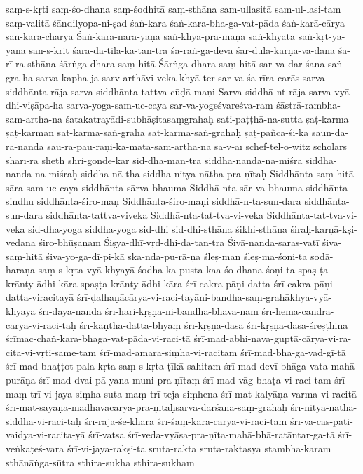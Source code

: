 {saṃ-s-kṛti 
saṃ-śo-dhana
saṃ-śodhitā
saṃ-sthāna
sam-ullasitā
sam-ul-lasi-tam
saṃ-valitā
śāndilyopa-ni-ṣad
śaṅ-kara
śaṅ-kara-bha-ga-vat-pāda
śaṅ-karā-cārya
san-kara-charya
Śaṅ-kara-nārā-yaṇa
saṅ-khyā-pra-māṇa
saṅ-khyāta
sāṅ-kṛt-yā-yana
san-s-krit
śāra-dā-tila-ka-tan-tra
śa-raṅ-ga-deva
śār-dūla-karṇā-va-dāna
śā-rī-ra-sthāna
śārṅga-dhara-saṃ-hitā
Śārṅga-dhara-saṃ-hitā
sar-va-dar-śana-saṅ-gra-ha
sarva-kapha-ja
sarv-arthāvi-veka-khyā-ter
sar-va-śa-rīra-carās
sarva-siddhānta-rāja
sarva-siddhānta-tattva-cūḍā-maṇi
Sarva-siddhā-nt-rāja
sarva-vyā-dhi-viṣāpa-ha
sarva-yoga-sam-uc-caya
sar-va-yogeśvareśva-ram
śāstrā-rambha-sam-artha-na
śatakatrayādi-subhāṣitasaṃgrahaḥ
sati-paṭṭhā-na-sutta
ṣaṭ-karma
ṣaṭ-karman
sat-karma-saṅ-graha
sat-karma-saṅ-grahaḥ
ṣaṭ-pañcā-śi-kā
saun-da-ra-nanda
sau-ra-pau-rāṇi-ka-mata-sam-artha-na
sa-v-āī
schef-tel-o-witz
scholars
sharī-ra
sheth
shri-gonde-kar
sid-dha-man-tra
siddha-nanda-na-miśra
siddha-nanda-na-miśraḥ
siddha-nā-tha
siddha-nitya-nātha-pra-ṇītaḥ
Siddhānta-saṃ-hitā-sāra-sam-uc-caya
siddhānta-sārva-bhauma
Siddhā-nta-sār-va-bhauma
siddhānta-sindhu
siddhānta-śiro-maṇ
Siddhānta-śiro-maṇi
siddhā-n-ta-sun-dara
siddhānta-sun-dara
siddhānta-tattva-viveka
Siddhā-nta-tat-tva-vi-veka
Siddhānta-tat-tva-vi-veka
sid-dha-yoga
siddha-yoga
sid-dhi
sid-dhi-sthāna
śikhi-sthāna
śiraḥ-karṇā-kṣi-vedana
śiro-bhūṣaṇam
Śiṣya-dhī-vṛd-dhi-da-tan-tra
Śivā-nanda-saras-vatī
śiva-saṃ-hitā
śiva-yo-ga-dī-pi-kā
ska-nda-pu-rā-ṇa
śleṣ-man
śleṣ-ma-śoni-ta
sodā-haraṇa-saṃ-s-kṛta-vyā-khyayā
śodha-ka-pusta-kaa
śo-dhana
śoṇi-ta
spaṣ-ṭa-krānty-ādhi-kāra
spaṣṭa-krānty-ādhi-kāra
śrī-cakra-pāṇi-datta
śrī-cakra-pāṇi-datta-viracitayā
śrī-ḍalhaṇācārya-vi-raci-tayāni-bandha-saṃ-grahākhya-vyā-khyayā
śrī-dayā-nanda
śrī-hari-kṛṣṇa-ni-bandha-bhava-nam
śrī-hema-candrā-cārya-vi-raci-taḥ
śrī-kaṇtha-dattā-bhyāṃ
śrī-kṛṣṇa-dāsa
śrī-kṛṣṇa-dāsa-śreṣṭhinā
śrīmac-chaṅ-kara-bhaga-vat-pāda-vi-raci-tā
śrī-mad-abhi-nava-guptā-cārya-vi-ra-cita-vi-vṛti-same-tam
śrī-mad-amara-siṃha-vi-racitam
śrī-mad-bha-ga-vad-gī-tā
śrī-mad-bhaṭṭot-pala-kṛta-saṃ-s-kṛta-ṭīkā-sahitam
śrī-mad-devī-bhāga-vata-mahā-purāṇa
śrī-mad-dvai-pā-yana-muni-pra-ṇītaṃ
śrī-mad-vāg-bhaṭa-vi-raci-tam
śrī-maṃ-trī-vi-jaya-siṃha-suta-maṃ-trī-teja-siṃhena
śrī-mat-kalyāṇa-varma-vi-racitā
śrī-mat-sāyaṇa-mādhavācārya-pra-ṇītaḥsarva-darśana-saṃ-grahaḥ
śrī-nitya-nātha-siddha-vi-raci-taḥ
śrī-rāja-śe-khara
śrī-śaṃ-karā-cārya-vi-raci-tam
śrī-vā-cas-pati-vaidya-vi-racita-yā
śrī-vatsa
śrī-veda-vyāsa-pra-ṇīta-mahā-bhā-ratāntar-ga-tā
śrī-veṅkaṭeś-vara
śrī-vi-jaya-rakṣi-ta
sruta-rakta
sruta-raktasya
stambha-karam
sthānāṅga-sūtra
sthira-sukha
sthira-sukham
}
